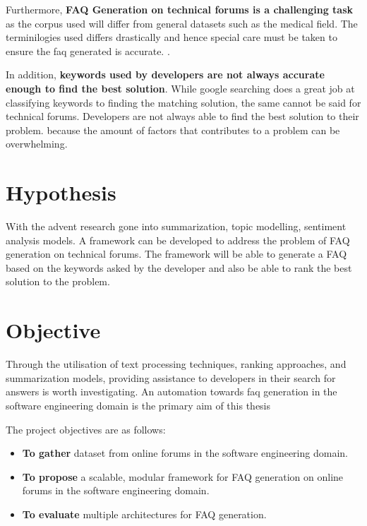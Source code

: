 Furthermore, \textbf{FAQ Generation on technical forums is a challenging task} as the corpus used will differ from general datasets such as the medical field. The terminilogies used differs drastically and hence special care must be taken to ensure the faq generated is accurate. \cite{stopwords_2} \cite{stopwords_1}.

In addition, \textbf{keywords used by developers are not always accurate enough to find the best solution}. While google searching does a great job at classifying keywords to finding the matching solution, the same cannot be said for technical forums. Developers are not always able to find the best solution to their problem. \cite{bugs_nightmare} because the amount of factors that contributes to a problem can be overwhelming.

\pagebreak
\section{Hypothesis}
With the advent research gone into summarization, topic modelling, sentiment analysis models. A framework can be developed to address the problem of FAQ generation on technical forums. The framework will be able to generate a FAQ based on the keywords asked by the developer and also be able to rank the best solution to the problem.

\vspace{1cm}
\section{Objective}
Through the utilisation of text processing techniques, ranking approaches, and summarization models, providing assistance to developers in their search for answers is worth investigating. An automation towards faq generation in the software engineering domain is the primary aim of this thesis

The project objectives are as follows:
\begin{itemize}
    \item \textbf{To gather} dataset from online forums in the software engineering domain.
    \item \textbf{To propose} a scalable, modular framework for FAQ generation on online forums in the software engineering domain.
    \item \textbf{To evaluate} multiple architectures for FAQ generation.

\end{itemize}

